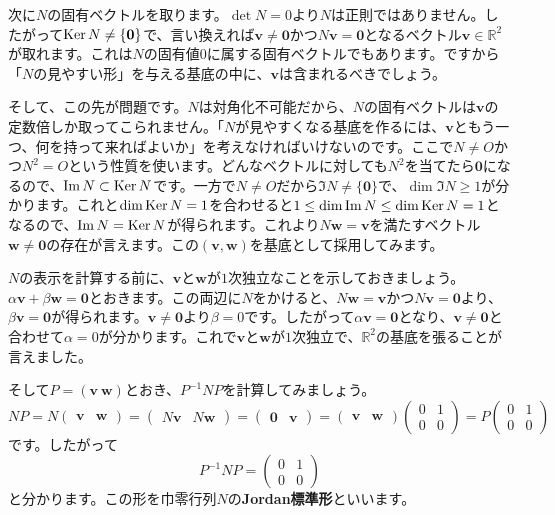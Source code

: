次に$N$の固有ベクトルを取ります。$\det N = 0$より$N$は正則ではありません。したがって$\operatorname{Ker} N \neq \{\boldsymbol{0}\}$で、言い換えれば$\bm{v} \neq \bm{0}$かつ$N\bm{v} = \bm{0}$となるベクトル$\bm{v} \in \mathbb{R}^2$が取れます。これは$N$の固有値$0$に属する固有ベクトルでもあります。ですから「$N$の見やすい形」を与える基底の中に、$\bm{v}$は含まれるべきでしょう。

そして、この先が問題です。$N$は対角化不可能だから、$N$の固有ベクトルは$\bm{v}$の定数倍しか取ってこられません。「$N$が見やすくなる基底を作るには、$\bm{v}$ともう一つ、何を持って来ればよいか」を考えなければいけないのです。ここで$N \neq O$かつ$N^2 = O$という性質を使います。どんなベクトルに対しても$N^2$を当てたら$\bm{0}$になるので、$\mathrm{Im}\, N \subset \operatorname{Ker} N$です。一方で$N \neq O$だから$\Im N \neq \{\bm{0}\}$で、$\dim \Im N \geq 1$が分かります。これと$\dim \operatorname{Ker} N = 1$を合わせると$1 \leq \dim \mathrm{Im}\, N \leq \dim \operatorname{Ker} N = 1$となるので、$\mathrm{Im}\, N = \operatorname{Ker} N$が得られます。これより$N\bm{w} = \bm{v}$を満たすベクトル$\bm{w} \neq \bm{0}$の存在が言えます。この$(\bm{v}, \bm{w})$を基底として採用してみます。

$N$の表示を計算する前に、$\bm{v}$と$\bm{w}$が$1$次独立なことを示しておきましょう。$\alpha \bm{v} + \beta \bm{w} = \bm{0}$とおきます。この両辺に$N$をかけると、$N\bm{w} = \bm{v}$かつ$N\bm{v} = \bm{0}$より、$\beta \bm{v} = \bm{0}$が得られます。$\bm{v} \neq \bm{0}$より$\beta = 0$です。したがって$\alpha \bm{v} = \bm{0}$となり、$\bm{v} \neq \bm{0}$と合わせて$\alpha = 0$が分かります。これで$\bm{v}$と$\bm{w}$が$1$次独立で、$\mathbb{R}^2$の基底を張ることが言えました。

そして$P = (\bm{v} \ \bm{w})$とおき、$P^{-1}NP$を計算してみましょう。
\[
NP = 
N
\begin{pmatrix}
\bm{v} & \bm{w}
\end{pmatrix}
=
\begin{pmatrix}
N\bm{v} & N\bm{w}
\end{pmatrix}
= 
\begin{pmatrix}
\bm{0} & \bm{v}
\end{pmatrix}
=
\begin{pmatrix}
\bm{v} & \bm{w}
\end{pmatrix}
\begin{pmatrix}
0 & 1 \\
0 & 0
\end{pmatrix}
=
P
\begin{pmatrix}
0 & 1 \\
0 & 0
\end{pmatrix}
\]
です。したがって
\[
P^{-1} N P =
\begin{pmatrix}
0 & 1 \\
0 & 0 
\end{pmatrix}
\]
と分かります。この形を巾零行列$N$の\textbf{Jordan標準形}といいます。

